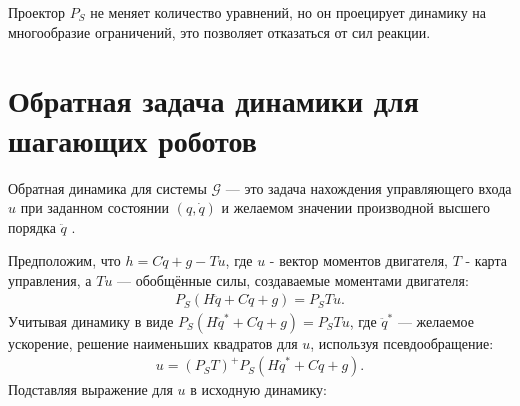 Проектор ${P}_S$ не меняет количество уравнений, но он проецирует динамику на многообразие ограничений, это позволяет отказаться от сил реакции.
%
\section{Обратная задача динамики для шагающих роботов}\label{sec:ch2/sect4}

Обратная динамика для системы $\mathcal{G}$ --- это задача нахождения управляющего входа ${u}$ при заданном состоянии $({q}, \dot{{q}})$ и желаемом значении производной высшего порядка $\ddot{{q}}$ \cite{Righetti2011}.
\begin{comment}
Динамика свободно плавающего робота с жёстким телом, подверженного внешним ограничениям, в общем случае задаётся следующим образом
\begin{equation}
	M \ddot{q} +h =S\T\tau + J_c\T \lambda,
\end{equation}
при $k$ ограничениях
\begin{equation}
	J_c \ddot{q} = b(q,\dot{q}),
\end{equation}
где $M \in \mathbb{R}^{n+6 \times n+6}$ - матрица инерции динамики жёсткого тела, $h \in \mathbb{R}^{n+6}$ - обобщённый вектор силы, содержащий эффекты Кориолиса, центробежные и гравитационные эффекты, $\tau \in \mathbb{R}^{n}$ - вектор воздействия и $S \in \mathbb{R}^{n \times n+6}$ - матрица выбора соединений, отражающая недостаточность действия - например, для большинства роботов с плавающей базой S будет матрицей тождества в первой подматрице $n \times n$, а в остальных местах - нули. 
$J_c \in \mathbb{R}^{k \times n+6}$ - Якобиан $k$ ограничений c $\lambda \in \mathbb{R}^{k}$ множителями Лагранжа, соответствующих ограничивающим силам.
\end{comment}
Предположим, что ${h} = {C}\dot{{q}} + {g} - {T}{u}$, где ${u}$ - вектор моментов двигателя, ${T}$ - карта управления, а ${T}{u}$ --- обобщённые силы, создаваемые моментами двигателя:
%
\begin{align}
	{P}_S({H}\ddot{{q}} + {C}\dot{{q}}+ {g}) = {P}_S{T}{u}.
\end{align}
%
Учитывая динамику в виде ${P}_S({H}\ddot{{q}}^* + {C}\dot{{q}}+ {g}) = {P}_S{T}{u}$, где $\ddot{{q}}^*$ --- желаемое ускорение, решение наименьших квадратов для ${u}$, используя псевдообращение:
%
\begin{align}
	{u}
	=
	({P}_S{T})^+{P}_S({H}\ddot{{q}}^* + {C}\dot{{q}}+ {g}).
\end{align}
%
Подставляя выражение для ${u}$ в исходную динамику:
